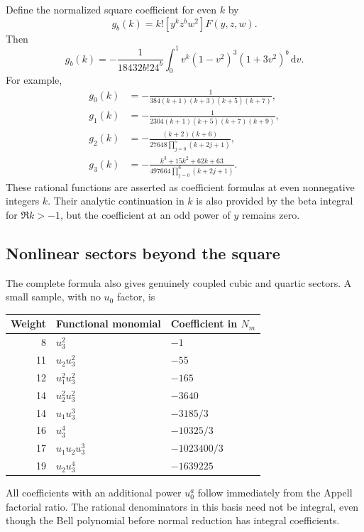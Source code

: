 \documentclass[11pt]{article}
\numberwithin{equation}{section}
\theoremstyle{definition}\newtheorem{definition}[theorem]{Definition}
\theoremstyle{remark}\newtheorem{remark}[theorem]{Remark}
\newcommand{\dd}{\,\mathrm d}
\begin{document}
Define the normalized square coefficient for even $k$ by
\[
 g_b(k)=k![y^kz^bw^2]F(y,z,w).
\]
Then
\begin{equation}\label{eq:gb-density}
 g_b(k)=-\frac1{18432b!24^b}
 \int_0^1v^k(1-v^2)^3(1+3v^2)^b\dd v.
\end{equation}
For example,
\begin{align}
 g_0(k)&=-\frac1{384(k+1)(k+3)(k+5)(k+7)},\label{eq:g0}\\
 g_1(k)&=-\frac1{2304(k+1)(k+5)(k+7)(k+9)},\label{eq:g1}\\
 g_2(k)&=-\frac{(k+2)(k+6)}{27648\prod_{j=0}^5(k+2j+1)},\label{eq:g2}\\
 g_3(k)&=-\frac{k^3+15k^2+62k+63}{497664\prod_{j=0}^6(k+2j+1)}.
 \label{eq:g3}
\end{align}
These rational functions are asserted as coefficient formulas at even
nonnegative integers $k$. Their analytic continuation in $k$ is also
provided by the beta integral for $\Re k>-1$, but the coefficient at an
odd power of $y$ remains zero.

\subsection{Nonlinear sectors beyond the square}
The complete formula also gives genuinely coupled cubic and quartic
sectors. A small sample, with no $u_0$ factor, is
\begin{center}
\begin{tabular}{rll}
\toprule
Weight & Functional monomial & Coefficient in $N_m$\\
\midrule
8 & $u_3^2$ & $-1$\\
11 & $u_2u_3^2$ & $-55$\\
12 & $u_1^2u_3^2$ & $-165$\\
14 & $u_2^2u_3^2$ & $-3640$\\
14 & $u_1u_3^3$ & $-3185/3$\\
16 & $u_3^4$ & $-10325/3$\\
17 & $u_1u_2u_3^3$ & $-1023400/3$\\
19 & $u_2u_3^4$ & $-1639225$\\
\bottomrule
\end{tabular}
\end{center}
All coefficients with an additional power $u_0^a$ follow immediately
from the Appell factorial ratio. The rational denominators in this
basis need not be integral, even though the Bell polynomial before
normal reduction has integral coefficients.
\end{document}
